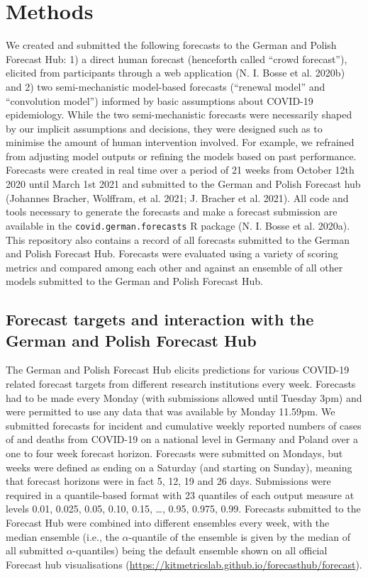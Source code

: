 \documentclass[
]{article}
\begin{document}
\hypertarget{methods}{%
\section{Methods}\label{methods}}

We created and submitted the following forecasts to the German and Polish Forecast Hub: 1) a direct human forecast (henceforth called ``crowd forecast''), elicited from participants through a web application (N. I. Bosse et al. 2020b) and 2) two semi-mechanistic model-based forecasts (``renewal model'' and ``convolution model'') informed by basic assumptions about COVID-19 epidemiology. While the two semi-mechanistic forecasts were necessarily shaped by our implicit assumptions and decisions, they were designed such as to minimise the amount of human intervention involved. For example, we refrained from adjusting model outputs or refining the models based on past performance. Forecasts were created in real time over a period of 21 weeks from October 12th 2020 until March 1st 2021 and submitted to the German and Polish Forecast hub (Johannes Bracher, Wolffram, et al. 2021; J. Bracher et al. 2021). All code and tools necessary to generate the forecasts and make a forecast submission are available in the \texttt{covid.german.forecasts} R package (N. I. Bosse et al. 2020a). This repository also contains a record of all forecasts submitted to the German and Polish Forecast Hub. Forecasts were evaluated using a variety of scoring metrics and compared among each other and against an ensemble of all other models submitted to the German and Polish Forecast Hub.

\hypertarget{forecast-targets-and-interaction-with-the-german-and-polish-forecast-hub}{%
\subsection{Forecast targets and interaction with the German and Polish Forecast Hub}\label{forecast-targets-and-interaction-with-the-german-and-polish-forecast-hub}}

The German and Polish Forecast Hub elicits predictions for various COVID-19 related forecast targets from different research institutions every week. Forecasts had to be made every Monday (with submissions allowed until Tuesday 3pm) and were permitted to use any data that was available by Monday 11.59pm. We submitted forecasts for incident and cumulative weekly reported numbers of cases of and deaths from COVID-19 on a national level in Germany and Poland over a one to four week forecast horizon. Forecasts were submitted on Mondays, but weeks were defined as ending on a Saturday (and starting on Sunday), meaning that forecast horizons were in fact 5, 12, 19 and 26 days. Submissions were required in a quantile-based format with 23 quantiles of each output measure at levels 0.01, 0.025, 0.05, 0.10, 0.15, \ldots, 0.95, 0.975, 0.99. Forecasts submitted to the Forecast Hub were combined into different ensembles every week, with the median ensemble (i.e., the \(\alpha\)-quantile of the ensemble is given by the median of all submitted \(\alpha\)-quantiles) being the default ensemble shown on all official Forecast hub visualisations (\url{https://kitmetricslab.github.io/forecasthub/forecast}).
\end{document}
